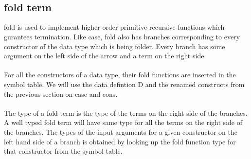 \documentclass[11pt]{article}
\begin{document}
~~\\~~\\

\subsection {fold term}
{\sf fold} is used to implement higher order primitive recursive functions which gurantees termination. Like case, fold also has branches corresponding to every constructor of the data type which is being folder. Every branch has some argument on the left side of the arrow and a term on the right side. 
~~\\~~\\
For all the constructors of a data type, their fold functions are  inserted in the symbol table. We will use the data defintion D and the renamed constructs from the previous section on case and cons.
~~\\~~\\
The type of a {\sf fold} term is the type of the terms on the right side of the branches. A well typed {\sf fold} term will have same type for all the terms on the right side of the branches. The types of the input arguments for a given constructor on the left hand side of a branch is obtained by looking up the fold function type for that constructor from the symbol table. 
~~\\~~\\
\newpage
\end{document}
